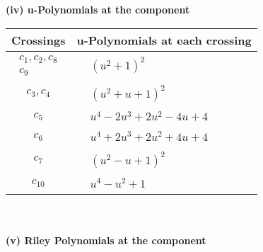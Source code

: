 \documentclass[1p]{elsarticle_modified}
\theoremstyle{definition}
\begin{document}
\newpage\renewcommand{\arraystretch}{1}
\flushleft \textbf{(iv) u-Polynomials at the component}\newline \\
\begin{tabular}{m{50pt}|m{274pt}}
Crossings & \hspace{64pt}u-Polynomials at each crossing \\
\hline $$\begin{aligned}c_{1},c_{2},c_{8}\\c_{9}\end{aligned}$$&$\begin{aligned}
&(u^2+1)^2
\end{aligned}$\\
\hline $$\begin{aligned}c_{3},c_{4}\end{aligned}$$&$\begin{aligned}
&(u^2+u+1)^2
\end{aligned}$\\
\hline $$\begin{aligned}c_{5}\end{aligned}$$&$\begin{aligned}
&u^4-2 u^3+2 u^2-4 u+4
\end{aligned}$\\
\hline $$\begin{aligned}c_{6}\end{aligned}$$&$\begin{aligned}
&u^4+2 u^3+2 u^2+4 u+4
\end{aligned}$\\
\hline $$\begin{aligned}c_{7}\end{aligned}$$&$\begin{aligned}
&(u^2- u+1)^2
\end{aligned}$\\
\hline $$\begin{aligned}c_{10}\end{aligned}$$&$\begin{aligned}
&u^4- u^2+1
\end{aligned}$\\
\hline
\end{tabular}\\~\\
\newpage\renewcommand{\arraystretch}{1}
\flushleft \textbf{(v) Riley Polynomials at the component}\newline \\
\end{document}
